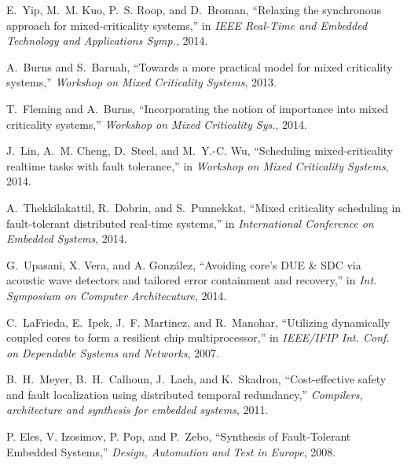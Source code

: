 \documentclass[conference]{IEEEtran}
\begin{document}
\begin{thebibliography}{10}
\vspace{-0.5mm}
E.~Yip, M.~M. Kuo, P.~S. Roop, and D.~Broman,
``Relaxing the synchronous
  approach for mixed-criticality systems,'' in \emph{IEEE Real-Time and Embedded
  Technology and Applications Symp.}, 2014.

\vspace{-0.5mm}
A.~Burns and S.~Baruah, ``Towards a more practical model for mixed criticality
  systems,'' \emph{Workshop on Mixed Criticality Systems}, 2013.

\vspace{-0.5mm}
T.~Fleming and A.~Burns, ``Incorporating the notion of importance into mixed
  criticality systems,'' \emph{Workshop on Mixed Criticality  Sys.}, 2014.


\vspace{-0.5mm}
J.~Lin, A.~M. Cheng, D.~Steel, and M.~Y.-C. Wu, ``Scheduling mixed-criticality
  realtime tasks with fault tolerance,'' in \emph{Workshop on Mixed
  Criticality Systems}, 2014.


\vspace{-0.5mm}
A.~Thekkilakattil, R.~Dobrin, and S.~Punnekkat, ``Mixed criticality scheduling
  in fault-tolerant distributed real-time systems,'' in \emph{International Conference on Embedded Systems}, 2014.


\vspace{-0.5mm}
G.~Upasani, X. Vera, and A. Gonz\'{a}lez,
``Avoiding core's DUE \& SDC via acoustic wave detectors and tailored error containment and recovery,''
in \emph{Int. Symposium on Computer Architecuture}, 2014.


\vspace{-0.5mm}
C.~LaFrieda, E.~Ipek, J.~F. Martinez, and R.~Manohar, ``Utilizing dynamically
 coupled cores to form a resilient chip multiprocessor,'' in \emph{IEEE/IFIP Int.
 Conf. on Dependable Systems and Networks}, 2007.



\vspace{-0.5mm}
B.~H.~Meyer, B.~H.~Calhoun,  J.~Lach, and K.~Skadron,
``Cost-effective safety and fault localization using distributed temporal redundancy,''
\emph{Compilers, architecture and synthesis for embedded systems}, 2011.


\vspace{-0.5mm}
P. Eles, V. Izosimov, P. Pop, and P.~Zebo, ``Synthesis of Fault-Tolerant Embedded Systems,''
\emph{Design, Automation and Test in Europe}, 2008.



\end{thebibliography}
\end{document}
